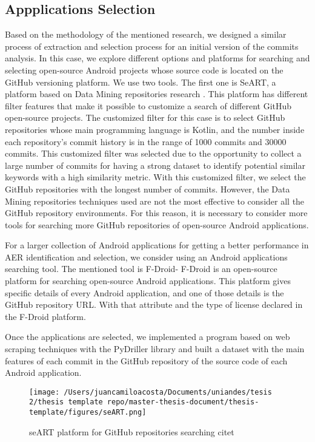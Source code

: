 \subsection{Appplications Selection}
Based on the methodology of the mentioned research, we designed a similar process of extraction and selection process for an initial version of the commits analysis. In this case, we explore different options and platforms for searching and selecting open-source Android projects whose source code is located on the GitHub versioning platform. We use two tools. The first one is SeART, a platform based on Data Mining repositories research \cite{seart_platform}. This platform has different filter features that make it possible to customize a search of different GitHub open-source projects. The customized filter for this case is to select GitHub repositories whose main programming language is Kotlin, and the number inside each repository's commit history is in the range of 1000 commits and 30000 commits. This customized filter was selected due to the opportunity to collect a large number of commits for having a strong dataset to identify potential similar keywords with a high similarity metric. With this customized filter, we select the GitHub repositories with the longest number of commits. However, the Data Mining repositories techniques used are not the most effective to consider all the GitHub repository environments. For this reason, it is necessary to consider more tools for searching more GitHub repositories of open-source Android applications.



For a larger collection of Android applications for getting a better performance in AER identification and selection, we consider using an Android applications searching tool. The mentioned tool is F-Droid- F-Droid is an open-source platform for searching open-source Android applications. This platform gives specific details of every Android application, and one of those details is the GitHub repository URL. With that attribute and the type of license declared in the F-Droid platform.

Once the applications are selected, we implemented a program based on web scraping techniques with the PyDriller library and built a dataset with the main features of each commit in the GitHub repository of the source code of each Android application.

\begin{figure}[h]
    	\centering
    		\texttt{[image: /Users/juancamiloacosta/Documents/uniandes/tesis 2/thesis template repo/master-thesis-document/thesis-template/figures/seART.png]}
   			 \caption{seART platform for GitHub repositories searching citet{} }
   			 \label{fig:ast}
\end{figure}

